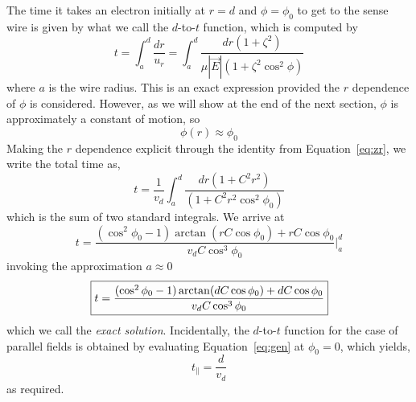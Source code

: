 \documentclass[twoside]{article}
\begin{document}
\begin{multicols}{2}
 The time it takes an electron initially at $r = d$ and $\phi = \phi_0$ to get to the sense wire is given by what we call the $d$-to-$t$ function, which is computed by
\begin{equation}
\label{eq:exact}
t = \int_{a}^{d} \frac{dr}{u_r}  = \int_{a}^{d} \frac{ dr (1 + \zeta^2)}{\mu |\vec{E}| (1 + \zeta^2 \cos^2 \phi)} 
\end{equation}
where $a$ is the wire radius. This is an exact expression provided the $r$ dependence of $\phi$ is considered. However, as we will show at the end of the next section, $\phi$ is approximately a constant of motion, so
\begin{equation}
\phi(r) \approx \phi_0
\end{equation}
Making the $r$ dependence explicit through the identity from Equation~\ref{eq:zr}, we write the total time as,
\begin{equation}
t = \frac{1}{v_d} \int_{a}^{d} \frac{ dr (1 + C^2 r^2)}{(1 + C^2 r^2 \cos^2 \phi_0)} 
\end{equation}
which is the sum of two standard integrals. We arrive at
\begin{equation}
t = \frac{(\cos^2 \phi_0 - 1) \arctan(r C \cos \phi_0 ) + r C \cos \phi_0 }{v_d C \cos^3 \phi_0} \bigg|^d_a
\end{equation}
invoking the approximation $a \approx 0$
\begin{equation}
\boxed{
\label{eq:gen}
t = \frac{(\cos^2 \phi_0 - 1) \arctan(d C \cos \phi_0 ) + d C \cos \phi_0 }{v_d C \cos^3 \phi_0} 
}
\end{equation}
which we call the \emph{exact solution}. Incidentally, the $d$-to-$t$ function for the case of parallel fields is obtained by evaluating Equation~\ref{eq:gen} at $ \phi_0 = 0$, which yields,
\begin{equation}
t_{\parallel} = \frac{d}{v_d} 
\end{equation}
as required.






\end{multicols}
\end{document}
